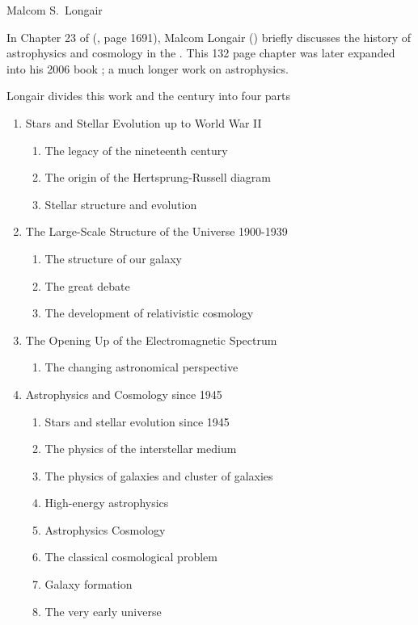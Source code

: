 
Malcom S.\ Longair

In Chapter 23 of  (\cite{Physics1995},
page 1691), Malcom Longair (\cite{Longair1995}) briefly discusses the
history of astrophysics and cosmology in the .  This 132 page
chapter was later expanded into his 2006 book ;
a much longer work on  astrophysics.

Longair divides this work and the century into four parts

\begin{enumerate}
\item Stars and Stellar Evolution up to World War II
  \begin{enumerate}
  \item The legacy of the nineteenth century
  \item The origin of the Hertsprung-Russell diagram
  \item Stellar structure and evolution
  \end{enumerate}

\item The Large-Scale Structure of the Universe 1900-1939
  \begin{enumerate}
  \item The structure of our galaxy
  \item The great debate
  \item The development of relativistic cosmology
  \end{enumerate}

\item The Opening Up of the Electromagnetic Spectrum
  \begin{enumerate}
  \item The changing astronomical perspective
  \end{enumerate}

\item Astrophysics and Cosmology since 1945
  \begin{enumerate}
  \item Stars and stellar evolution since 1945
  \item The physics of the interstellar medium
  \item The physics of galaxies and cluster of galaxies
  \item High-energy astrophysics
  \item Astrophysics Cosmology
  \item The classical cosmological problem
  \item Galaxy formation
  \item The very early universe
  \end{enumerate}
\end{enumerate}

